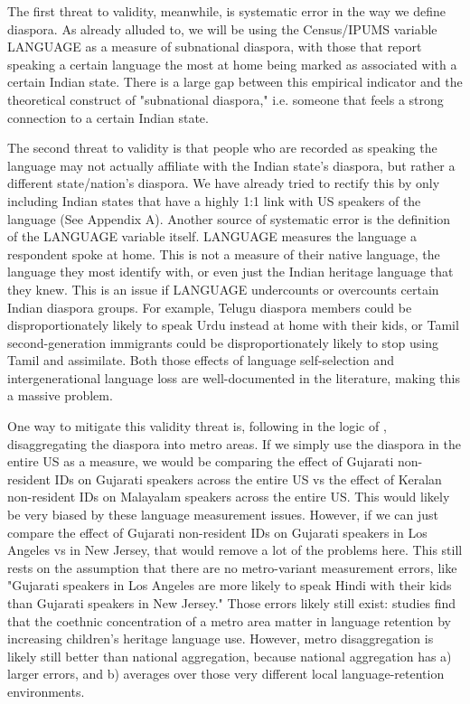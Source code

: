 \documentclass[doublespace,nopageskip]{UVAthesis}
\begin{document}
The first threat to validity, meanwhile, is systematic error in the way we define diaspora. As already alluded to, we will be using the Census/IPUMS variable LANGUAGE as a measure of subnational diaspora, with those that report speaking a certain language the most at home being marked as associated with a certain Indian state. There is a large gap between this empirical indicator and the theoretical construct of "subnational diaspora," i.e. someone that feels a strong connection to a certain Indian state.

The second threat to validity is that people who are recorded as speaking the language may not actually affiliate with the Indian state's diaspora, but rather a different state/nation's diaspora. We have already tried to rectify this by only including Indian states that have a highly 1:1 link with US speakers of the language (See Appendix A). Another source of systematic error is the definition of the LANGUAGE variable itself. LANGUAGE measures the language a respondent spoke at home. This is not a measure of their native language, the language they most identify with, or even just the Indian heritage language that they knew. This is an issue if LANGUAGE undercounts or overcounts certain Indian diaspora groups. For example, Telugu diaspora members could be disproportionately likely to speak Urdu instead at home with their kids, or Tamil second-generation immigrants could be disproportionately likely to stop using Tamil and assimilate. Both those effects of language self-selection and intergenerational language loss are well-documented in the literature,\citep{escobar_indian_2022} making this a massive problem.

One way to mitigate this validity threat is, following in the logic of \citet{mayda_refugees_2022}, disaggregating the diaspora into metro areas. If we simply use the diaspora in the entire US as a measure, we would be comparing the effect of Gujarati non-resident IDs on Gujarati speakers across the entire US vs the effect of Keralan non-resident IDs on Malayalam speakers across the entire US. This would likely be very biased by these language measurement issues. However, if we can just compare the effect of Gujarati non-resident IDs on Gujarati speakers in Los Angeles vs in New Jersey, that would remove a lot of the problems here. This still rests on the assumption that there are no metro-variant measurement errors, like "Gujarati speakers in Los Angeles are more likely to speak Hindi with their kids than Gujarati speakers in New Jersey." Those errors likely still exist: studies find that the coethnic concentration of a metro area matter in language retention by increasing children's heritage language use\citep{chondrogianni_heritage_2023, white_neighborhood_2017}. However, metro disaggregation is likely still better than national aggregation, because national aggregation has a) larger errors, and b) averages over those very different local language-retention environments. 
\end{document}

